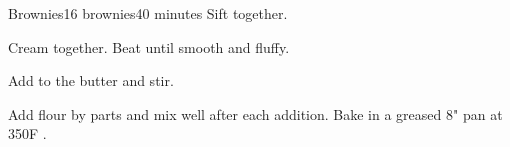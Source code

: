 \documentclass[../Cookbook.tex]{subfiles}
\begin{document}
\begin{recipe}[Brownies]{Brownies}{16 brownies}{40 minutes}
Sift together.

Cream together. Beat until smooth and fluffy.

Add to the butter and stir.

Add flour by parts and mix well after each addition.
Bake in a greased 8" pan at 350\0F .
\end{recipe}
\end{document}

